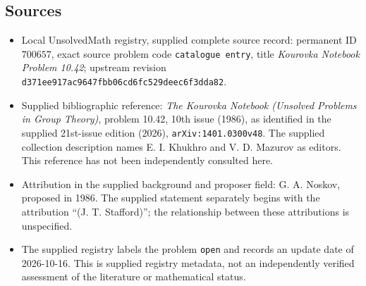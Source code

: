 \documentclass[11pt]{article}
\begin{document}
\subsection{Sources}
\begin{itemize}
\item Local UnsolvedMath registry, supplied complete source record: permanent ID \(700657\), exact source problem code \texttt{catalogue entry}, title \emph{Kourovka Notebook Problem 10.42}; upstream revision \texttt{d371ee917ac9647fbb06cd6fc529deec6f3dda82}.
\item Supplied bibliographic reference: \emph{The Kourovka Notebook (Unsolved Problems in Group Theory)}, problem 10.42, 10th issue (1986), as identified in the supplied 21st-issue edition (2026), \texttt{arXiv:1401.0300v48}. The supplied collection description names E. I. Khukhro and V. D. Mazurov as editors. This reference has not been independently consulted here.
\item Attribution in the supplied background and proposer field: G. A. Noskov, proposed in 1986. The supplied statement separately begins with the attribution ``(J. T. Stafford)''; the relationship between these attributions is unspecified.
\item The supplied registry labels the problem \texttt{open} and records an update date of 2026-10-16. This is supplied registry metadata, not an independently verified assessment of the literature or mathematical status.
\end{itemize}
\end{document}
